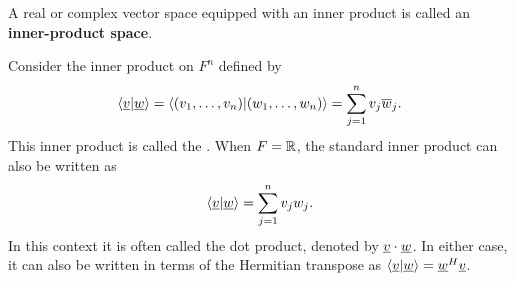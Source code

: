 \begin{definition}
A real or complex vector space equipped with an inner product is called an \textbf{inner-product space}.
\end{definition}

\begin{example} \label{example:StandardInnerProduct}
Consider the inner product on $F^n$ defined by
\begin{equation*}
\left\langle \underline{v} | \underline{w} \right\rangle
= \left\langle (v_1, \ldots, v_n) | (w_1, \ldots, w_n) \right\rangle
= \sum_{j=1}^n v_j \overline{w}_j.
\end{equation*}
This inner product is called the .
When $F = \mathbb{R}$, the standard inner product can also be written as
\begin{equation*}
\left\langle \underline{v} | \underline{w} \right\rangle
= \sum_{j=1}^n v_j w_j.
\end{equation*}
In this context it is often called the dot product, denoted by $\underline{v} \cdot \underline{w}$.
In either case, it can also be written in terms of the Hermitian transpose as $ \left\langle \underline{v} | \underline{w} \right\rangle = \underline{w}^H \underline{v} $.

\end{example}

